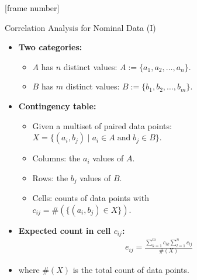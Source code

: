 \documentclass[aspectratio=169,t]{beamer}
\begin{document}
  {
    [frame number]
    \begin{frame}{Correlation Analysis for Nominal Data (I)}
      \begin{itemize}
        \item \textbf{Two categories:}
        \begin{itemize}
          \item $A$ has $n$ distinct values: $A := \{a_1, a_2, \ldots, a_n\}$.
          \item $B$ has $m$ distinct values: $B := \{b_1, b_2, \ldots, b_m\}$.
        \end{itemize}
        \item \textbf{\color{airforceblue}Contingency table:}
        \begin{itemize}
          \item Given a multiset of paired data points: $X = \{(a_i,b_j) \; \vert \; a_i \in A \; \text{and} \; b_j \in B\}$.
          \item Columns: the $a_i$ values of $A$.
          \item Rows: the $b_j$ values of $B$.
          \item Cells: counts of data points with \\
          $c_{ij} = \#(\{(a_i,b_j) \in X \})$.
        \end{itemize}
        \item \textbf{Expected count in cell $c_{ij}$:}
        \begin{align}
          e_{ij} = \frac{\sum_{k=1}^{m} c_{ik}\sum_{l=1}^{n} c_{lj}}{\#(X)}
        \end{align}
        \item where $\#(X)$ is the total count of data points.
      \end{itemize}
    \end{frame}
  }
\end{document}
